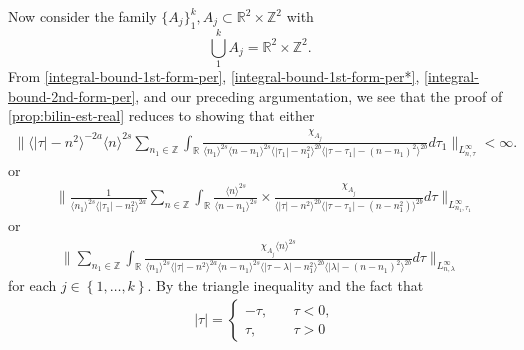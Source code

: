 \documentclass[12pt,reqno]{amsart}
\numberwithin{equation}{section}  %
\numberwithin{figure}{section}
\newcommand{\rr}{\mathbb{R}}
\newcommand{\zz}{\mathbb{Z}}
\theoremstyle{plain}
\theoremstyle{definition}
\theoremstyle{remark}
\begin{document}
%
%
Now consider the family $\{A_{j}\}_{1}^{k}, A_{j} \subset \rr^{2} \times
\zz^{2}$ with
$$\bigcup_{1}^{k} A_{j}= \rr^{2} \times
\zz^{2}.$$ From \eqref{integral-bound-1st-form-per},
\eqref{integral-bound-1st-form-per*},
\eqref{integral-bound-2nd-form-per}, and our preceding argumentation,
we see that the proof of \autoref{prop:bilin-est-real} reduces to showing that
either 
%
%
%
%
\begin{equation}
  \label{key-sup-estimate-per-1}
  \begin{split}
     \| \langle | \tau | - n^{2} \rangle ^{-2a} \langle n
    \rangle ^{2s}
    \sum_{n_{1} \in \zz}
    \int_{\rr} \frac{\chi_{A_{j}}}{ \langle n_{1} \rangle ^{2s} \langle
n-n_{1} \rangle ^{2s} \langle | \tau_{1}|-n_{1}^{2} \rangle^{2b}  \langle  |\tau -
    \tau_{1} | -(n - n_{1})^{2}
    \rangle ^{2b} } d \tau_1  \|_{L^\infty_{n, \tau}} < \infty.
  \end{split}
\end{equation}
%
or
\begin{equation}
  \label{key-sup-estimate-per-2}
\begin{split}
  & \| \frac{1}{\langle n_{1} \rangle ^{2s}
  \langle | \tau_{1} | - n_{1}^{2} \rangle
  ^{2a}} \sum_{n \in \zz} \int_{\rr} \frac{\langle n \rangle ^{2s}}{\langle
  n - n_{1}\rangle ^{2s}}  \times \frac{\chi_{A_{j}}}{\langle | \tau | - n^{2} \rangle ^{2b} \langle | \tau -
  \tau_{1} | - (n - n_{1}^{2}) \rangle ^{2b}} d \tau 
  \|_{L^{\infty}_{n_{1}, \tau_{1}}}
\end{split}
\end{equation}
or
%
%
\begin{equation}
  \label{key-sup-estimate-per-3}
\begin{split}
  \| \sum_{n_{1} \in \zz} \int_{\rr} \frac{\chi_{A_{j}}
    \langle n \rangle ^{2s}
    }{ \langle n_{1} \rangle^{2s} \langle | \tau | - n^{2}
    \rangle ^{2a}  \langle
n-n_{1} \rangle ^{2s}  \langle | \tau - \lambda|-n_{1}^{2}
\rangle^{2b} \langle  | \lambda | -(n - n_{1})^{2}
\rangle^{2b} } d \tau  \|_{L^{\infty}_{n, \lambda}}
\end{split}
\end{equation}
%
%
for each $j \in \left\{ 1,\dots,k \right\}$. 
By the triangle inequality and the fact that 
%
%
\begin{equation*}
\begin{split}
& | \tau | =
\begin{cases}
  - \tau, \quad & \tau < 0, 
\\
\tau, \quad & \tau > 0
\end{cases}
\end{split}
\end{equation*}
\end{document}

